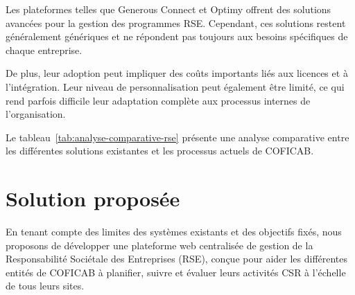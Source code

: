 Les plateformes telles que Generous Connect et Optimy offrent des solutions avancées pour la gestion des programmes RSE. Cependant, ces solutions restent généralement génériques et ne répondent pas toujours aux besoins spécifiques de chaque entreprise.

De plus, leur adoption peut impliquer des coûts importants liés aux licences et à l’intégration. Leur niveau de personnalisation peut également être limité, ce qui rend parfois difficile leur adaptation complète aux processus internes de l’organisation.

Le tableau~\ref{tab:analyse-comparative-rse} présente une analyse comparative entre les différentes solutions existantes et les processus actuels de COFICAB.



\section{Solution proposée}

En tenant compte des limites des systèmes existants et des objectifs fixés, nous proposons de développer une plateforme web centralisée de gestion de la Responsabilité Sociétale des Entreprises (RSE), conçue pour aider les différentes entités de COFICAB à planifier, suivre et évaluer leurs activités CSR à l’échelle de tous leurs sites.

